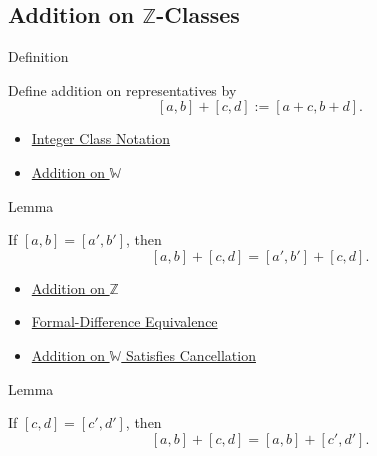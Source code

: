 \subsection*{Addition on $\mathbb{Z}$-Classes}

\begin{definitionbox}{Definition}
\begin{definition}
\label{def:addition-on-z-classes}
Define addition on representatives by
\[
[a,b]+[c,d]:=[a+c,b+d].
\]
\end{definition}
\end{definitionbox}

\begin{dependencies}
\begin{itemize}
  \item \hyperref[def:integer-class-notation]{Integer Class Notation}
  \item \hyperref[def:addition-on-w]{Addition on $\mathbb{W}$}
\end{itemize}
\end{dependencies}

\begin{lemmabox}{Lemma}
\begin{lemma}
\label{lem:addition-on-z-classes-respects-left-equivalence}
If $[a,b]=[a',b']$, then
\[
[a,b]+[c,d]=[a',b']+[c,d].
\]
\end{lemma}
\end{lemmabox}

\begin{dependencies}
\begin{itemize}
  \item \hyperref[def:addition-on-z-classes]{Addition on $\mathbb{Z}$}
  \item \hyperref[def:formal-difference-equivalence]{Formal-Difference Equivalence}
  \item \hyperref[thm:addition-on-w-cancellation]{Addition on $\mathbb{W}$ Satisfies Cancellation}
\end{itemize}
\end{dependencies}

\begin{lemmabox}{Lemma}
\begin{lemma}
\label{lem:addition-on-z-classes-respects-right-equivalence}
If $[c,d]=[c',d']$, then
\[
[a,b]+[c,d]=[a,b]+[c',d'].
\]
\end{lemma}
\end{lemmabox}


